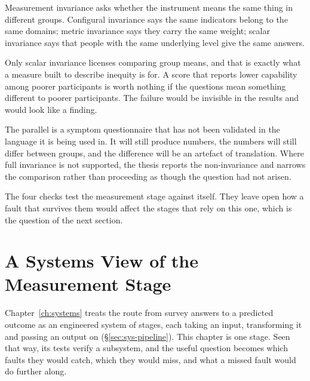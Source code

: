 \medskip
{}

\begin{reading}
Measurement invariance asks whether the instrument means the same thing in
different groups. Configural invariance says the same indicators belong to the
same domains; metric invariance says they carry the same weight; scalar
invariance says that people with the same underlying level give the same
answers.

Only scalar invariance licenses comparing group means, and that is exactly what
a measure built to describe inequity is for. A score that reports lower
capability among poorer participants is worth nothing if the questions mean
something different to poorer participants. The failure would be invisible in
the results and would look like a finding.

The parallel is a symptom questionnaire that has not been validated in the
language it is being used in. It will still produce numbers, the numbers will
still differ between groups, and the difference will be an artefact of
translation. Where full invariance is not supported, the thesis reports the
non-invariance and narrows the comparison rather than proceeding as though the
question had not arisen.
\end{reading}

The four checks test the measurement stage against itself. They leave open how a fault that survives them would affect the stages that rely on this one, which is the question of the next section.

\section{A Systems View of the Measurement Stage}
\label{sec:anal-systems}
Chapter~\ref{ch:systems} treats the route from survey answers to a predicted outcome as an engineered system of stages, each taking an input, transforming it and passing an output on (\S\ref{sec:sys-pipeline}). This chapter is one stage. Seen that way, its tests verify a subsystem, and the useful question becomes which faults they would catch, which they would miss, and what a missed fault would do further along.

